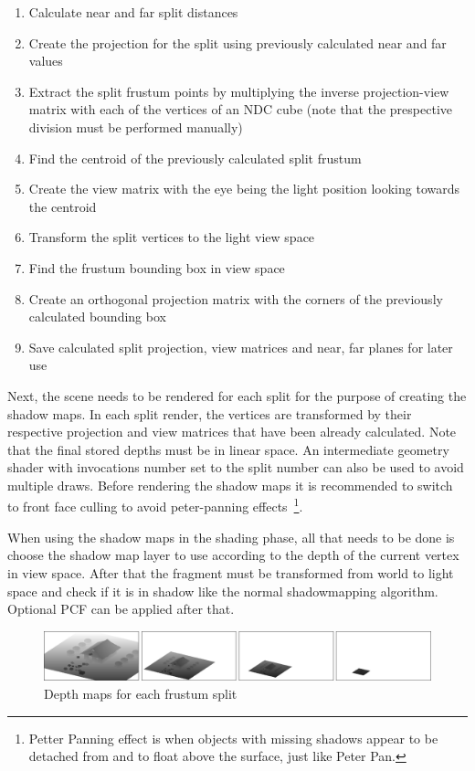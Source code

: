 \begin{enumerate}
\item Calculate near and far split distances
\item Create the projection for the split using previously calculated near and far values
\item Extract the split frustum points by multiplying the inverse projection-view matrix
    with each of the vertices of an NDC cube (note that the prespective division must
    be performed manually)
\item Find the centroid of the previously calculated split frustum
\item Create the view matrix with the eye being the light position looking towards the centroid
\item Transform the split vertices to the light view space
\item Find the frustum bounding box in view space
\item Create an orthogonal projection matrix with the corners of the previously calculated bounding box
\item Save calculated split projection, view matrices and near, far planes for later use
\end{enumerate}

Next, the scene needs to be rendered for each split for the purpose of creating the shadow maps.
In each split render, the vertices are transformed by their respective projection and view matrices
that have been already calculated. Note that the final stored depths must be in linear space.
An intermediate geometry shader with invocations number set to the split number can also be used
to avoid multiple draws. Before rendering the shadow maps it is recommended to switch to front
face culling to avoid peter-panning effects~\footnote{Petter Panning effect is when objects with missing shadows
appear to be detached from and to float above the surface, just like Peter Pan.}.

When using the shadow maps in the shading phase, all that needs to be done is choose the shadow
map layer to use according to the depth of the current vertex in view space. After that
the fragment must be transformed from world to light space and check if it is in shadow like
the normal shadowmapping algorithm. Optional PCF can be applied after that.

\begin{figure}[b]
    \centering
    \includegraphics[scale=0.3, clip=true]{./image/csmbufs.png}
    \caption{Depth maps for each frustum split}
\label{fig:csmbufs}
\end{figure}


